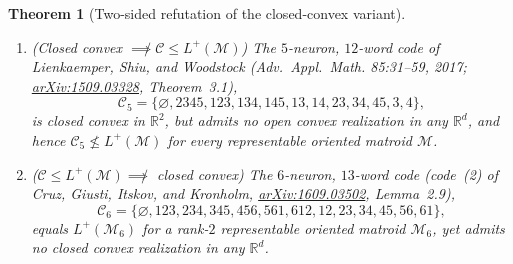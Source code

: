 \documentclass[11pt]{article}
\theoremstyle{plain}
\newtheorem{theorem}{Theorem}
\theoremstyle{definition}
\theoremstyle{remark}
\begin{document}
\begin{theorem}[Two-sided refutation of the closed-convex variant]\label{thm:closed}
\begin{enumerate}[label=\textup{(\arabic*)}]
\item \emph{(Closed convex $\not\implies \mathcal{C} \le L^+(\mathcal{M})$)} The $5$-neuron, $12$-word code of Lienkaemper, Shiu, and Woodstock (\emph{Adv.\ Appl.\ Math.} 85:31--59, 2017; \href{https://arxiv.org/abs/1509.03328}{arXiv:1509.03328}, Theorem~3.1),
\[
\mathcal{C}_5 = \{\varnothing, 2345, 123, 134, 145, 13, 14, 23, 34, 45, 3, 4\},
\]
is closed convex in $\mathbb{R}^2$, but admits no open convex realization in any $\mathbb{R}^d$, and hence $\mathcal{C}_5 \not\le L^+(\mathcal{M})$ for every representable oriented matroid $\mathcal{M}$.

\item \emph{($\mathcal{C} \le L^+(\mathcal{M}) \not\implies$ closed convex)} The $6$-neuron, $13$-word code (code~(2) of Cruz, Giusti, Itskov, and Kronholm, \href{https://arxiv.org/abs/1609.03502}{arXiv:1609.03502}, Lemma~2.9),
\[
\mathcal{C}_6 = \{\varnothing, 123, 234, 345, 456, 561, 612, 12, 23, 34, 45, 56, 61\},
\]
equals $L^+(\mathcal{M}_6)$ for a rank-$2$ representable oriented matroid $\mathcal{M}_6$, yet admits no closed convex realization in any $\mathbb{R}^d$.
\end{enumerate}
\end{theorem}
\end{document}

